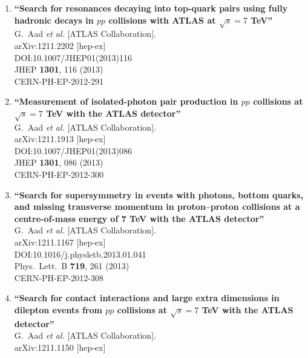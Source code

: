 \documentclass{article}
\begin{document}
\begin{enumerate}
\item%
{\bf ``Search for resonances decaying into top-quark pairs using fully hadronic decays in $pp$ collisions with ATLAS at $\sqrt{s}=7$ TeV''}
  \\{}G.~Aad {\it et al.} [ATLAS Collaboration].
  \\{}arXiv:1211.2202 [hep-ex]
  \\{}DOI:10.1007/JHEP01(2013)116
  \\{}JHEP {\bf 1301}, 116 (2013)
  \\{}CERN-PH-EP-2012-291
\item%
{\bf ``Measurement of isolated-photon pair production in $pp$ collisions at $\sqrt{s}=7$ TeV with the ATLAS detector''}
  \\{}G.~Aad {\it et al.} [ATLAS Collaboration].
  \\{}arXiv:1211.1913 [hep-ex]
  \\{}DOI:10.1007/JHEP01(2013)086
  \\{}JHEP {\bf 1301}, 086 (2013)
  \\{}CERN-PH-EP-2012-300
\item%
{\bf ``Search for supersymmetry in events with photons, bottom quarks, and missing transverse momentum in proton–proton collisions at a centre-of-mass energy of 7 TeV with the ATLAS detector''}
  \\{}G.~Aad {\it et al.} [ATLAS Collaboration].
  \\{}arXiv:1211.1167 [hep-ex]
  \\{}DOI:10.1016/j.physletb.2013.01.041
  \\{}Phys.\ Lett.\ B {\bf 719}, 261 (2013)
  \\{}CERN-PH-EP-2012-308
\item%
{\bf ``Search for contact interactions and large extra dimensions in dilepton events from $pp$ collisions at $\sqrt{s}=7$ TeV with the ATLAS detector''}
  \\{}G.~Aad {\it et al.} [ATLAS Collaboration].
  \\{}arXiv:1211.1150 [hep-ex]

\end{enumerate}
\end{document}
